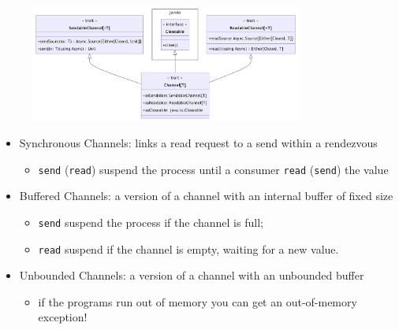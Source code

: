 \documentclass[aspectratio=1610,xcolor=dvipsnames,handout]{beamer}
\begin{document}
\begin{frame}  
  \begin{figure}
    \centering
    \includegraphics[width=0.8\textwidth]{./images/channels-uml.png}
  \end{figure}
  \begin{itemize}
      \item Synchronous Channels: links a read request to a send within a rendezvous
      \begin{itemize}
          \item \texttt{send} (\texttt{read}) suspend the process until a consumer \texttt{read} (\texttt{send}) the value
      \end{itemize}
      \item Buffered Channels: a version of a channel with an internal buffer of fixed size
      \begin{itemize}
          \item \texttt{send} suspend the process if the channel is full;
          \item \texttt{read} suspend if the channel is empty, waiting for a new value.
      \end{itemize}
      \item Unbounded Channels: a version of a channel with an unbounded buffer
      \begin{itemize}
          \item if the programs run out of memory you can get an out-of-memory exception!
      \end{itemize}
  \end{itemize}
\end{frame}
%
\end{document}
